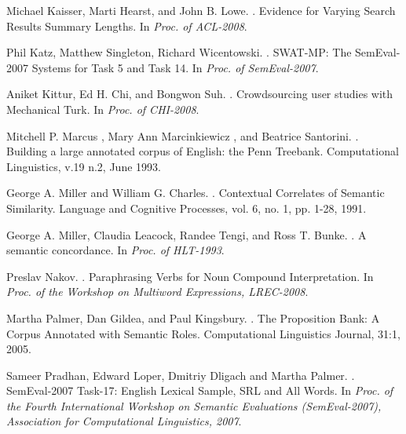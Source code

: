 \documentclass[11pt]{article}
\begin{document}
\begin{thebibliography}{}
Michael Kaisser, Marti Hearst, and John B. Lowe. 
.
\newblock Evidence for Varying Search Results Summary Lengths. 
\newblock In \textit{Proc. of ACL-2008}.

Phil Katz, Matthew Singleton, Richard Wicentowski. 
.
\newblock SWAT-MP: The SemEval-2007 Systems for Task 5 and Task 14.
\newblock In \textit{ Proc. of SemEval-2007}.

Aniket Kittur, Ed H. Chi, and Bongwon Suh. 
.
\newblock Crowdsourcing user studies with Mechanical Turk. 
\newblock In \textit{ Proc. of CHI-2008}.

Mitchell P. Marcus , Mary Ann Marcinkiewicz , and Beatrice Santorini.
.
\newblock Building a large annotated corpus of English: the Penn Treebank.
\newblock Computational Linguistics, v.19 n.2, June 1993.

George A. Miller and William G. Charles.
.
\newblock Contextual Correlates of Semantic Similarity.
\newblock Language and Cognitive Processes, vol. 6, no. 1, pp. 1-28, 1991.

George A. Miller, Claudia Leacock, Randee Tengi, and Ross T. Bunke.
.
\newblock A semantic concordance.
\newblock In \textit{Proc. of HLT-1993}.

Preslav Nakov.
.
\newblock Paraphrasing Verbs for Noun Compound Interpretation.
\newblock In \textit{Proc. of the Workshop on Multiword Expressions, LREC-2008}.



Martha Palmer, Dan Gildea, and Paul Kingsbury.
.
\newblock The Proposition Bank: A Corpus Annotated with Semantic Roles.
\newblock Computational Linguistics Journal, 31:1, 2005.

Sameer Pradhan, Edward Loper, Dmitriy Dligach and Martha Palmer. 
.
\newblock SemEval-2007 Task-17: English Lexical Sample, SRL and All Words. 
\newblock In \textit{ Proc. of the Fourth International Workshop on Semantic Evaluations (SemEval-2007), Association for Computational Linguistics, 2007}.


\end{thebibliography}
\end{document}
